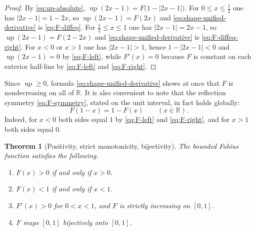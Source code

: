 \documentclass[11pt,oneside]{article}
\newtheorem{theorem}{Theorem}[section]
\theoremstyle{definition}
\theoremstyle{remark}
\newcommand{\R}{\mathbb R}
\newcommand{\Up}{\operatorname{up}}
\begin{document}
\begin{proof}
By \eqref{eq:up-absolute}, $\Up(2x-1)=F\bigl(1-|2x-1|\bigr)$.  For $0\le x\le\tfrac12$ one has
$|2x-1|=1-2x$, so $\Up(2x-1)=F(2x)$ and \eqref{eq:shape-unified-derivative} is
\eqref{eq:F-diffeq}.  For $\tfrac12\le x\le1$ one has $|2x-1|=2x-1$, so $\Up(2x-1)=F(2-2x)$
and \eqref{eq:shape-unified-derivative} is \eqref{eq:F-diffeq-right}.  For $x<0$ or $x>1$ one
has $|2x-1|>1$, hence $1-|2x-1|<0$ and $\Up(2x-1)=0$ by \eqref{eq:F-left}, while $F'(x)=0$
because $F$ is constant on each exterior half-line by \eqref{eq:F-left} and
\eqref{eq:F-right}.
\end{proof}

Since $\Up\ge0$, formula \eqref{eq:shape-unified-derivative} shows at once that $F$ is
nondecreasing on all of $\R$.  It is also convenient to note that the reflection symmetry
\eqref{eq:F-symmetry}, stated on the unit interval, in fact holds globally:
\begin{equation}
 F(1-x)=1-F(x)\qquad(x\in\R).                             \label{eq:shape-symmetry-global}
\end{equation}
Indeed, for $x<0$ both sides equal $1$ by \eqref{eq:F-left} and \eqref{eq:F-right}, and for
$x>1$ both sides equal $0$.

\begin{theorem}[Positivity, strict monotonicity, bijectivity]
\label{thm:shape-bijection}
The bounded Fabius function satisfies the following.
\begin{enumerate}
\item $F(x)>0$ if and only if $x>0$.
\item $F(x)<1$ if and only if $x<1$.
\item $F'(x)>0$ for $0<x<1$, and $F$ is strictly increasing on $[0,1]$.
\item $F$ maps $[0,1]$ bijectively onto $[0,1]$.
\end{enumerate}
\end{theorem}
\end{document}
